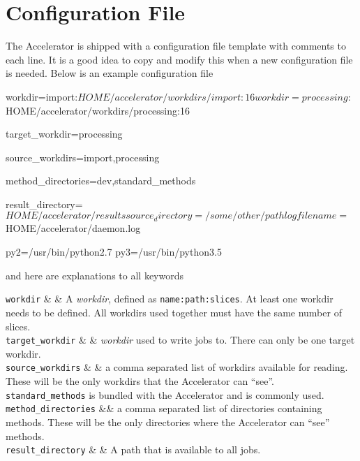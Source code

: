 
\section{Configuration File}

The Accelerator is shipped with a configuration file template with
comments to each line.  It is a good idea to copy and modify this when
a new configuration file is needed.  Below is an example configuration
file
\begin{leftbar}
\begin{shell}
workdir=import:${HOME}/accelerator/workdirs/import:16
workdir=processing:${HOME}/accelerator/workdirs/processing:16

target_workdir=processing

source_workdirs=import,processing

method_directories=dev,standard_methods

result_directory=${HOME}/accelerator/results

source_directory=/some/other/path

logfilename=${HOME}/accelerator/daemon.log

py2=/usr/bin/python2.7
py3=/usr/bin/python3.5
\end{shell}
\end{leftbar}
\noindent and here are explanations to all keywords
\starttable

\RP \texttt{workdir} & & A \textsl{workdir}, defined as
\texttt{name:path:slices}.  At least one workdir needs to be defined.
All workdirs used together must have the same number of slices.\\

\RP \texttt{target\_workdir} & & \textsl{workdir} used to
write jobs to.  There can only be one target workdir.\\

\RP \texttt{source\_workdirs} & & a comma separated list of workdirs
available for reading.  These will be the only workdirs that the
Accelerator can ``see''.  \texttt{standard\_methods} is bundled with
the Accelerator and is commonly used.\\

\RP \texttt{method\_directories} && a comma separated list of
directories containing methods.  These will be the only directories
where the Accelerator can ``see'' methods.\\

\RP \texttt{result\_directory} & & A path that is available to all
jobs.    \\

